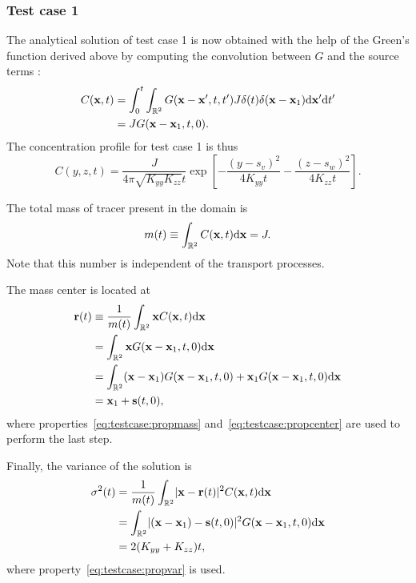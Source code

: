 \subsubsection{Test case 1}
The analytical solution of test case 1 is now obtained with the help of the Green's function derived above by computing the convolution between $G$ and the source terms :
\begin{align}
	C(\b x,t) &= \int_{0}^{t} \int_{\R[2]} G(\b x - \b x',t,t') J \delta(t) \delta(\b x- \b x_1) \rm d \b{x}' \rm dt'\nonumber\\
	&= J G(\b x - \b x_1,t,0).
\end{align}
The concentration profile for test case 1 is thus
\begin{equation}
	C(y,z,t) = \frac{J}{4\pi\sqrt{K_{yy}K_{zz}}t}\exp\left[-\frac{(y-s_v)^2}{4K_{yy}t} -\frac{(z-s_w)^2}{4K_{zz}t} \right].
\end{equation}

The total mass of tracer present in the domain is
\begin{equation}
	m(t) \equiv \int_{\R[2]} C(\b x,t) \rm d \b x = J.
\end{equation}
Note that this number is independent of the transport processes.

The mass center is located at
\begin{align}
	\b r(t) &\equiv \frac{1}{m(t)} \int_{\R[2]} \b x C(\b x,t) \rm d \b x \nonumber \\
	&= \int_{\R[2]} \b x G(\b x - \b x_1,t,0) \rm d \b x \nonumber\\
	&= \int_{\R[2]} (\b x-\b x_1) G(\b x - \b x_1,t,0) + \b x_1 G(\b x - \b x_1,t,0) \rm d \b x\nonumber\\
	&= \b x_1 + \b s(t,0),
\end{align}
where properties~\eqref{eq:testcase:propmass} and~\eqref{eq:testcase:propcenter} are used to perform the last step.

Finally, the variance of the solution is
\begin{align}
	\sigma^2(t) &= \frac{1}{m(t)} \int_{\R[2]} \lvert \b x - \b r(t) \rvert^2 C(\b x,t) \rm d \b x \nonumber \\
	&= \int_{\R[2]} \lvert (\b x - \b x_1) - \b s(t,0)\rvert^2 G(\b x - \b x_1,t,0) \rm d \b x \nonumber \\
	&= 2(K_{yy}+K_{zz})t,
\end{align}
where property~\eqref{eq:testcase:propvar} is used.

